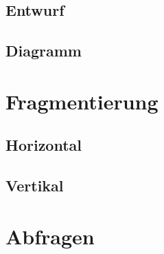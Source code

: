 \documentclass[12pt,a4paper,draft]{report}
\begin{document}
	\section{Entwurf}
	\section{Diagramm}
	\chapter{Fragmentierung}
	\section{Horizontal}
	\section{Vertikal}
	\chapter{Abfragen}
\end{document}
